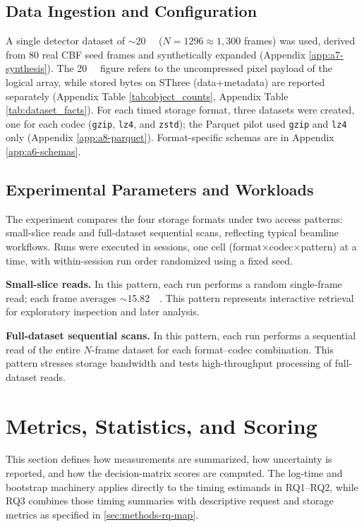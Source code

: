 \documentclass[nomenclature, english, bibtex]{kththesis}
\numberwithin{listing}{chapter}
\begin{document}
\subsection{Data Ingestion and Configuration}
A single detector dataset of \(\sim\)\SI{20}{\gibi\byte} (\(N{=}1296\approx1{,}300\) frames) was used, derived from 80 real \gls{CBF} seed frames and synthetically expanded (Appendix \ref{app:a7-synthesis}). The \SI{20}{\gibi\byte} figure refers to the uncompressed pixel payload of the logical array, while stored bytes on \gls{SThree} (data+metadata) are reported separately (Appendix Table \ref{tab:object_counts}, Appendix Table \ref{tab:dataset_facts}). For each timed storage format, three datasets were created, one for each codec (\texttt{gzip}, \texttt{lz4}, and \texttt{zstd}); the Parquet pilot used \texttt{gzip} and \texttt{lz4} only (Appendix \ref{app:a8-parquet}). Format-specific schemas are in Appendix \ref{app:a6-schemas}.

\subsection{Experimental Parameters and Workloads}
The experiment compares the four storage formats under two access patterns: small-slice reads and full-dataset sequential scans, reflecting typical beamline workflows. Runs were executed in sessions, one cell (format$\times$codec$\times$pattern) at a time, with within-session run order randomized using a fixed seed.

\textbf{Small-slice reads.} In this pattern, each run performs a random single-frame read; each frame averages \(\sim\)\SI{15.82}{\mebi\byte}. This pattern represents interactive retrieval for exploratory inspection and later analysis.

\textbf{Full-dataset sequential scans.} In this pattern, each run performs a sequential read of the entire $N$-frame dataset for each format--codec combination. This pattern stresses storage bandwidth and tests high-throughput processing of full-dataset reads.

\section{Metrics, Statistics, and Scoring}
\label{sec:methods-metrics}
This section defines how measurements are summarized, how uncertainty is reported, and how the decision-matrix scores are computed. The log-time and bootstrap machinery applies directly to the timing estimands in RQ1–RQ2, while RQ3 combines those timing summaries with descriptive request and storage metrics as specified in \ref{sec:methods-rq-map}.
\end{document}

